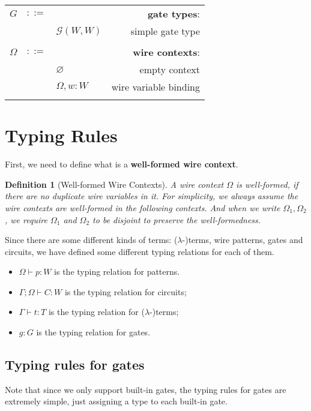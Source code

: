 \documentclass[12pt]{article}
\newtheorem{Def}{Definition}
\begin{document}
\begin{longtable}[c]{lclr}
  $G$ &$::=$ &  &\textbf{gate types}:\\
      & &$\mathcal{G}(W, W)$ &simple gate type\\
  \\

  $\Omega$ &$::=$ &  &\textbf{wire contexts}: \\
      & &$\varnothing$ &empty context\\
      & &$\Omega,w:W$ &wire variable binding\\
  \\

  \bottomrule
  
\end{longtable}

\section{Typing Rules}
First, we need to define what is a \textbf{well-formed wire context}.
\begin{Def}[Well-formed Wire Contexts]
  A wire context $\Omega$ is well-formed, if there are no duplicate wire variables in it.
  For simplicity, we always assume the wire contexts are well-formed in the following contexts. And when we write $\Omega_1, \Omega_2$, we require $\Omega_1$ and $\Omega_2$ to be disjoint to preserve the well-formedness.
\end{Def}

Since there are some different kinds of terms: ($\lambda$-)terms, wire patterns, gates and circuits, we have defined some different typing relations for each of them.
\begin{itemize}
  \item $\Omega \vdash p : W$ is the typing relation for patterns.
  \item $\Gamma ; \Omega \vdash C : W$ is the typing relation for circuits;
  \item $\Gamma \vdash t:T$ is the typing relation for ($\lambda$-)terms;
  \item $g : G$ is the typing relation for gates.
\end{itemize}

\subsection{Typing rules for gates}
Note that since we only support built-in gates, the typing rules for gates are extremely simple, just assigning a type to each built-in gate.
\end{document}

